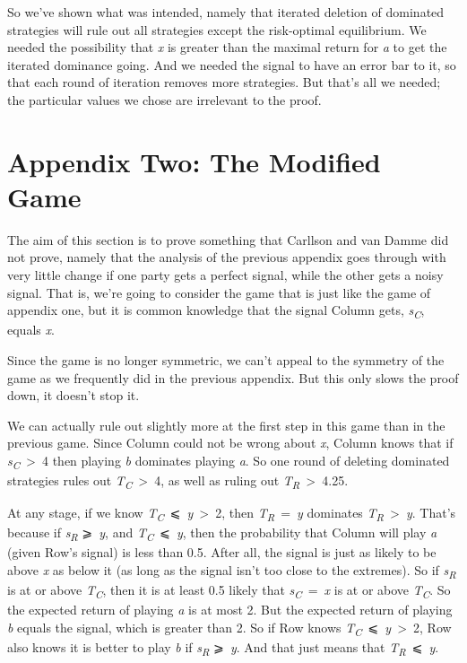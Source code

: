 \documentclass[
  11pt,
  letterpaper,
  DIV=11,
  numbers=noendperiod,
  twoside]{scrartcl}
\begin{document}
So we've shown what was intended, namely that iterated deletion of
dominated strategies will rule out all strategies except the
risk-optimal equilibrium. We needed the possibility that \emph{x} is
greater than the maximal return for \emph{a} to get the iterated
dominance going. And we needed the signal to have an error bar to it, so
that each round of iteration removes more strategies. But that's all we
needed; the particular values we chose are irrelevant to the proof.

\section*{Appendix Two: The Modified
Game}\label{appendixtwo:themodifiedgame}

The aim of this section is to prove something that Carllson and van
Damme did not prove, namely that the analysis of the previous appendix
goes through with very little change if one party gets a perfect signal,
while the other gets a noisy signal. That is, we're going to consider
the game that is just like the game of appendix one, but it is common
knowledge that the signal Column gets, \emph{s\textsubscript{C}}, equals
\emph{x}.

Since the game is no longer symmetric, we can't appeal to the symmetry
of the game as we frequently did in the previous appendix. But this only
slows the proof down, it doesn't stop it.

We can actually rule out slightly more at the first step in this game
than in the previous game. Since Column could not be wrong about
\emph{x}, Column knows that if \emph{s\textsubscript{C}}~\textgreater~4
then playing \emph{b} dominates playing \emph{a}. So one round of
deleting dominated strategies rules out
\emph{T\textsubscript{C}}~\textgreater~4, as well as ruling out
\emph{T\textsubscript{R}}~\textgreater~4.25.

At any stage, if we know
\emph{T\textsubscript{C}}~⩽~\emph{y}~\textgreater~2, then
\emph{T\textsubscript{R}}~=~\emph{y} dominates
\emph{T\textsubscript{R}}~\textgreater~\emph{y}. That's because if
\emph{s\textsubscript{R}} ⩾~\emph{y}, and
\emph{T\textsubscript{C}}~⩽~\emph{y}, then the probability that Column
will play \emph{a} (given Row's signal) is less than 0.5. After all, the
signal is just as likely to be above \emph{x} as below it (as long as
the signal isn't too close to the extremes). So if
\emph{s\textsubscript{R}} is at or above \emph{T\textsubscript{C}}, then
it is at least 0.5 likely that \emph{s\textsubscript{C}}~=~\emph{x} is
at or above \emph{T\textsubscript{C}}. So the expected return of playing
\emph{a} is at most 2. But the expected return of playing \emph{b}
equals the signal, which is greater than 2. So if Row knows
\emph{T\textsubscript{C}}~⩽~\emph{y}~\textgreater~2, Row also knows it
is better to play \emph{b} if \emph{s\textsubscript{R}} ⩾~\emph{y}. And
that just means that \emph{T\textsubscript{R}}~⩽~\emph{y}.
\end{document}
